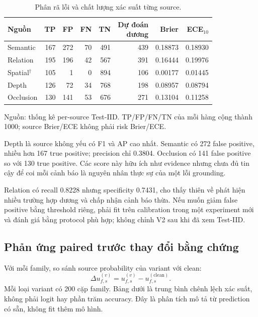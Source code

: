 \begin{table}[htbp]
    \centering
    \setlength{\tabcolsep}{4pt}
    \renewcommand{\arraystretch}{1.15}
    \caption{Phân rã lỗi và chất lượng xác suất từng source.}
    \label{tab:results-source-errors}
    \small
    \begin{tabularx}{\textwidth}{@{}>{\raggedright\arraybackslash}Xrrrrrrr@{}}
        \toprule
        Nguồn & TP & FP & FN & TN & \shortstack{Dự đoán\\dương} & Brier & ECE$_{10}$ \\
        \midrule
        Semantic & 167 & 272 & 70 & 491 & 439 & 0.18873 & 0.18930 \\
        Relation & 195 & 196 & 42 & 567 & 391 & 0.16444 & 0.19976 \\
        Spatial$^\dagger$ & 105 & 1 & 0 & 894 & 106 & 0.00177 & 0.01445 \\
        Depth & 126 & 72 & 34 & 768 & 198 & 0.08957 & 0.08794 \\
        Occlusion & 130 & 141 & 53 & 676 & 271 & 0.13104 & 0.11258 \\
        \bottomrule
    \end{tabularx}
    \vspace{2pt}
    {\footnotesize\raggedright Nguồn: thống kê per-source Test-IID.
    TP/FP/FN/TN của mỗi hàng cộng thành 1000;
    source Brier/ECE không phải risk Brier/ECE.\par}
\end{table}

Depth là source không yếu có F1 và AP cao nhất.
Semantic có 272 false positive, nhiều hơn 167
true positive; precision chỉ 0.3804. Occlusion
có 141 false positive so với 130 true positive.
Các score này hữu ích như evidence nhưng chưa
đủ tin cậy để coi mỗi cảnh báo là nguyên nhân
thực sự của một lỗi grounding.

Relation có recall 0.8228 nhưng specificity
0.7431, cho thấy thiên về phát hiện nhiều
trường hợp dương và chấp nhận cảnh báo thừa.
Nếu muốn giảm false positive bằng threshold
riêng, phải fit trên calibration trong một
experiment mới và đánh giá bằng protocol phù
hợp; không chỉnh V2 sau khi đã xem Test-IID.

\subsection{Phản ứng paired trước thay đổi bằng chứng}

Với mỗi family, so sánh source probability của
variant với clean:
\begin{equation}
    \Delta u_{f,s}^{(v)}
    =u_{f,s}^{(v)}-u_{f,s}^{(\mathrm{clean})}.
    \label{eq:results-source-delta}
\end{equation}
Mỗi loại variant có 200 cặp family. Bảng dưới
là trung bình chênh lệch xác suất, không phải
logit hay phần trăm accuracy. Đây là phân tích
mô tả từ prediction có sẵn, không fit thêm mô hình.

